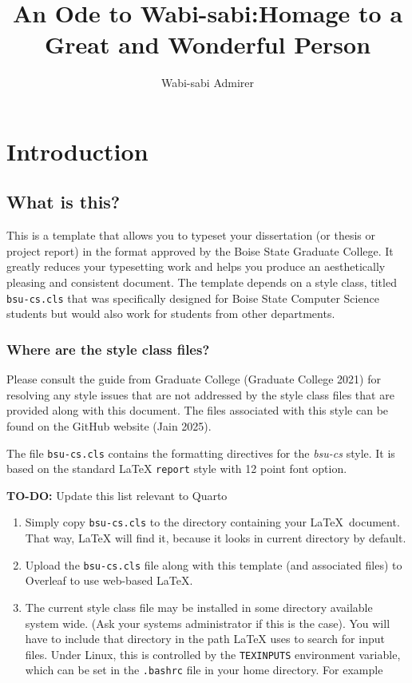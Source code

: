 \documentclass[
  dissertation]{bsu-cs}
\title{An Ode to Wabi-sabi:\titleBreak Homage to a Great and Wonderful
Person}
\author{Wabi-sabi Admirer}
\providecommand{\tightlist}{%
  \setlength{\itemsep}{0pt}\setlength{\parskip}{0pt}}\usepackage{longtable,booktabs,array}
\begin{document}
\frontmatter

\buildFrontPages




\mainmatter

\chapter{Introduction} \label{ch-intro}

\section{What is this?}\label{what-is-this}

This is a template that allows you to typeset your dissertation (or
thesis or project report) in the format approved by the Boise State
Graduate College. It greatly reduces your typesetting work and helps you
produce an aesthetically pleasing and consistent document. The template
depends on a style class, titled \texttt{bsu-cs.cls} that was
specifically designed for Boise State Computer Science students but
would also work for students from other departments.

\subsection{Where are the style class
files?}\label{where-are-the-style-class-files}

Please consult the guide from Graduate College (Graduate College 2021)
for resolving any style issues that are not addressed by the style class
files that are provided along with this document. The files associated
with this style can be found on the GitHub website (Jain 2025).

The file \texttt{bsu-cs.cls} contains the formatting directives for the
\emph{bsu-cs} style. It is based on the standard LaTeX \texttt{report}
style with 12 point font option.

\textbf{TO-DO:} Update this list relevant to Quarto

\begin{enumerate}
\def\labelenumi{\arabic{enumi}.}
\tightlist
\item
  Simply copy \texttt{bsu-cs.cls} to the directory containing your
  \LaTeX~document. That way, LaTeX will find it, because it looks in
  current directory by default.
\item
  Upload the \texttt{bsu-cs.cls} file along with this template (and
  associated files) to Overleaf to use web-based LaTeX.
\item
  The current style class file may be installed in some directory
  available system wide. (Ask your systems administrator if this is the
  case). You will have to include that directory in the path LaTeX uses
  to search for input files. Under Linux, this is controlled by the
  \texttt{TEXINPUTS} environment variable, which can be set in the
  \texttt{.bashrc} file in your home directory. For example
\end{enumerate}
\end{document}
